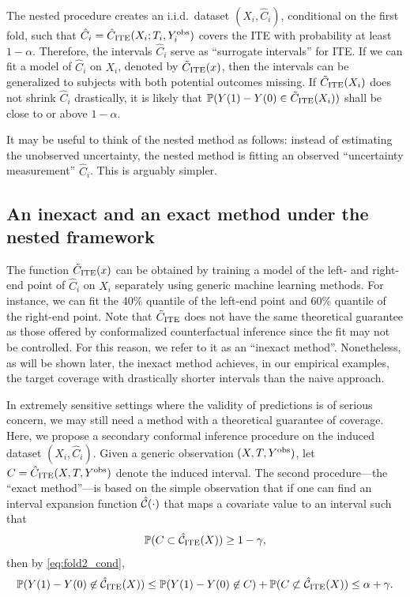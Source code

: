 The nested procedure creates an i.i.d.~dataset $(X_{i}, \hat{C}_{i})$,
conditional on the first fold, such that
$\hat{C}_{i} = \hat{C}_\text{ITE}(X_{i}; T_{i}, Y_{i}^{\mathrm{obs}})$ covers the ITE
with probability at least $1 - \alpha$. Therefore, the intervals
$\hat{C}_{i}$ serve as ``surrogate intervals'' for ITE. If we can fit
a model of $\hat{C}_{i}$ on $X_{i}$, denoted by $\tilde{C}_\text{ITE}(x)$, then the
intervals can be generalized to subjects with both potential outcomes
missing. If $\tilde{C}_\text{ITE}(X_{i})$ does not shrink $\hat{C}_{i}$ drastically,
it is likely that $\mathbb{P}(Y(1) - Y(0)\in \tilde{C}_\text{ITE}(X_{i}))$ shall be close to
or above $1 - \alpha$.

It may be useful to think of the nested method as follows:
  instead of estimating the unobserved uncertainty, the nested method
  is fitting an observed ``uncertainty measurement''
  $\hat{C}_{i}$. This is arguably simpler.

\subsection{An inexact and an exact method under the nested framework}
The function $\tilde{C}_\text{ITE}(x)$ can be obtained by training a model of the
left- and right-end point of $\hat{C}_{i}$ on $X_{i}$ separately using
generic machine learning methods. For instance, we can fit the 40\% quantile of the left-end point and 60\% quantile of the right-end point. Note that $\tilde{C}_\text{ITE}$ does not have the
same theoretical guarantee as those offered by conformalized
counterfactual inference since the fit may not be controlled. For this
reason, we refer to it as an ``inexact method''. Nonetheless,  as will
be shown later, the inexact method achieves, in our empirical
examples, the target coverage with drastically shorter intervals than
the naive approach.


In extremely sensitive settings where the validity of predictions is
of serious concern, we may still need a method with a theoretical
guarantee of coverage. Here, we propose a secondary conformal
inference procedure on the induced dataset $(X_{i}, \hat{C}_{i})$.
Given a generic observation $(X, T, Y^{\mathrm{obs}})$, let
$C = \hat{C}_\text{ITE}(X, T, Y^{\mathrm{obs}})$ denote the induced interval. The second
procedure---the ``exact method''---is based on the simple observation
that if one can find an interval expansion function $\hat{\mathcal{C}}(\cdot)$
that maps a covariate value to an interval such that
\begin{equation}
  \label{eq:interval_conformal_goal}
  \mathbb{P}(C\subset \hat{\mathcal{C}}_\text{ITE}(X))\ge 1 - \gamma,
\end{equation}
then by \eqref{eq:fold2_cond}, 
\[\mathbb{P}(Y(1) - Y(0) \not\in \hat{\mathcal{C}}_\text{ITE}(X))\le \mathbb{P}(Y(1) - Y(0) \not\in C) + \mathbb{P}(C\not\subset \hat{\mathcal{C}}_\text{ITE}(X))\le \alpha + \gamma.\]

